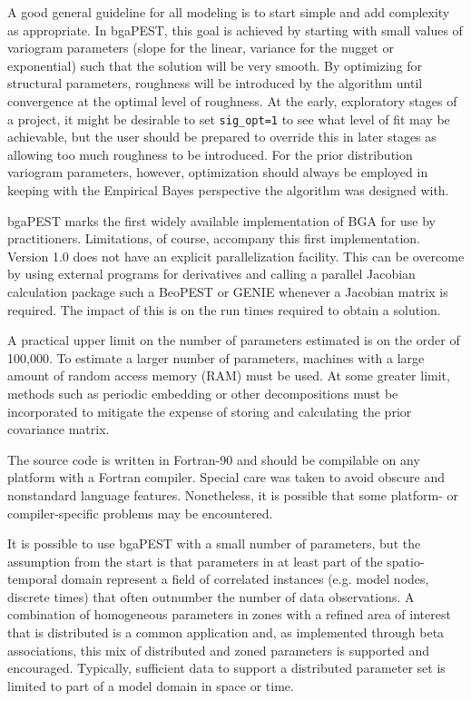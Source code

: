 \documentclass[11pt,oneside,onecolumn]{usgsreport}
\begin{document}
\begin{multicols}{2}
A good general guideline for all modeling is to start simple and add
complexity as appropriate. In bgaPEST, this goal is achieved by starting
with small values of variogram parameters (slope for the linear, variance
for the nugget or exponential) such that the solution will be very
smooth. By optimizing for structural parameters, roughness will be
introduced by the algorithm until convergence at the optimal level
of roughness. At the early, exploratory stages of a project, it might
be desirable to set \texttt{sig\_opt=1} to see what level of fit may
be achievable, but the user should be prepared to override this in
later stages as allowing too much roughness to be introduced. For
the prior distribution variogram parameters, however, optimization
should always be employed in keeping with the Empirical Bayes perspective
the algorithm was designed with.



bgaPEST marks the first widely available implementation of BGA for
use by practitioners. Limitations, of course, accompany this first
implementation. Version 1.0 does not have an explicit parallelization
facility. This can be overcome by using external programs for derivatives
and calling a parallel Jacobian calculation package such a BeoPEST
\citep{beoPEST} or GENIE \citep{GENIE} whenever a Jacobian matrix
is required. The impact of this is on the run times required to obtain
a solution.

A practical upper limit on the number of parameters estimated is on
the order of 100,000. To estimate a larger number of parameters, machines
with a large amount of random access memory (RAM) must be used. At
some greater limit, methods such as periodic embedding or other decompositions
must be incorporated to mitigate the expense of storing and calculating
the prior covariance matrix.

The source code is written in Fortran-90 and should be compilable
on any platform with a Fortran compiler. Special care was taken to
avoid obscure and nonstandard language features. Nonetheless, it is
possible that some platform- or compiler-specific problems may be
encountered. 

It is possible to use bgaPEST with a small number of parameters, but
the assumption from the start is that parameters in at least part
of the spatio-temporal domain represent a field of correlated instances
(e.g. model nodes, discrete times) that often outnumber the number
of data observations. A combination of homogeneous parameters in zones
with a refined area of interest that is distributed is a common application
and, as implemented through beta associations, this mix of distributed
and zoned parameters is supported and encouraged. Typically, sufficient
data to support a distributed parameter set is limited to part of
a model domain in space or time.


\end{multicols}
\end{document}
